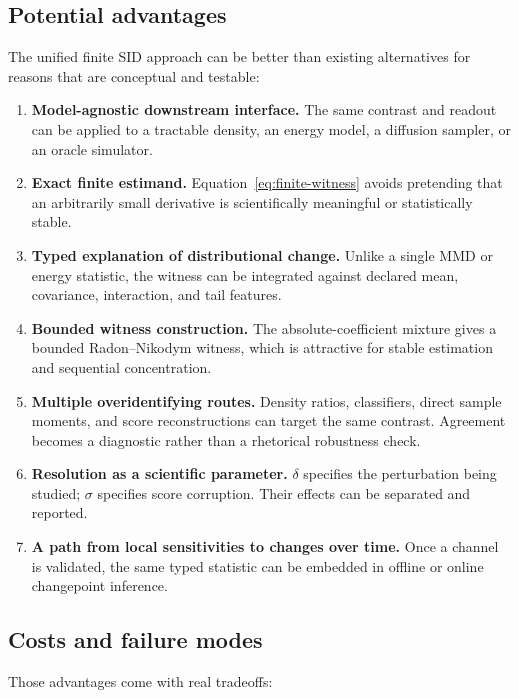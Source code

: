 \documentclass[10pt]{article}
\begin{document}
\subsection{Potential advantages}

The unified finite SID approach can be better than existing alternatives for reasons that are conceptual and testable:

\begin{enumerate}
  \item \textbf{Model-agnostic downstream interface.} The same contrast and readout can be applied to a tractable density, an energy model, a diffusion sampler, or an oracle simulator.
  \item \textbf{Exact finite estimand.} Equation~\eqref{eq:finite-witness} avoids pretending that an arbitrarily small derivative is scientifically meaningful or statistically stable.
  \item \textbf{Typed explanation of distributional change.} Unlike a single MMD or energy statistic, the witness can be integrated against declared mean, covariance, interaction, and tail features.
  \item \textbf{Bounded witness construction.} The absolute-coefficient mixture gives a bounded Radon--Nikodym witness, which is attractive for stable estimation and sequential concentration.
  \item \textbf{Multiple overidentifying routes.} Density ratios, classifiers, direct sample moments, and score reconstructions can target the same contrast. Agreement becomes a diagnostic rather than a rhetorical robustness check.
  \item \textbf{Resolution as a scientific parameter.} \(\delta\) specifies the perturbation being studied; \(\sigma\) specifies score corruption. Their effects can be separated and reported.
  \item \textbf{A path from local sensitivities to changes over time.} Once a channel is validated, the same typed statistic can be embedded in offline or online changepoint inference.
\end{enumerate}

\subsection{Costs and failure modes}

Those advantages come with real tradeoffs:
\end{document}
